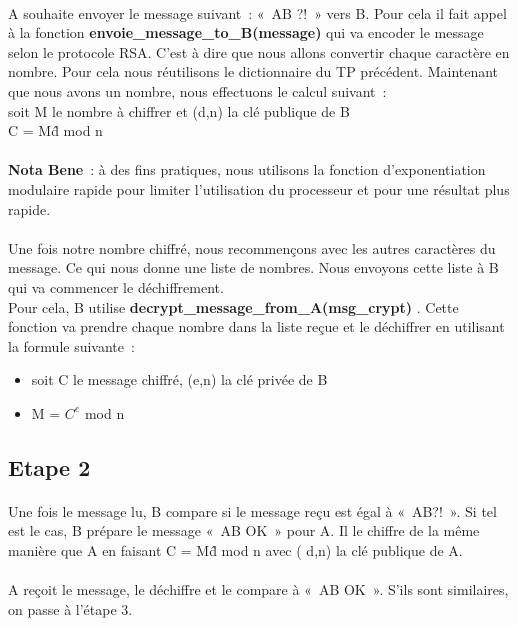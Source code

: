 \documentclass[11pt,fleqn]{book} %
\begin{document}
\paragraph{}A souhaite envoyer le message suivant : « AB ?! » vers B. Pour cela il fait appel à la fonction \textbf{envoie\_message\_to\_B(message)} qui va encoder le message selon le protocole RSA. C'est à dire que nous allons convertir chaque caractère en nombre. Pour cela nous réutilisons le dictionnaire du TP précédent. Maintenant que nous avons un nombre, nous effectuons le calcul suivant : 
\\soit M le nombre à chiffrer et (d,n) la clé publique de B
\\C = M\^d mod n
\\\\\textbf{Nota Bene} : à des fins pratiques, nous utilisons la fonction d'exponentiation modulaire rapide pour limiter l'utilisation du processeur et pour une résultat plus rapide.
\\\\Une fois notre nombre chiffré, nous recommençons avec les autres caractères du message. Ce qui nous donne une liste de nombres. Nous envoyons cette liste à B qui va commencer le déchiffrement.
\\Pour cela, B utilise \textbf{decrypt\_message\_from\_A(msg\_crypt)} . Cette fonction va prendre chaque nombre dans la liste reçue et le déchiffrer en utilisant la formule suivante : 
\begin{itemize}
 \item soit C le message chiffré, (e,n) la clé privée de B
 \item M = $C^e$ mod n
\end{itemize}

\subsection{Etape 2}
\paragraph{}Une fois le message lu, B compare si le message reçu est égal à « AB?! ». Si tel est le cas, B prépare le message « AB OK » pour A. Il le chiffre de la même manière que A en faisant C = M\^d mod n avec ( d,n) la clé publique de A.
\\\\A reçoit le message, le déchiffre et le compare à « AB OK ». S'ils sont similaires, on passe à l'étape 3.
\end{document}
